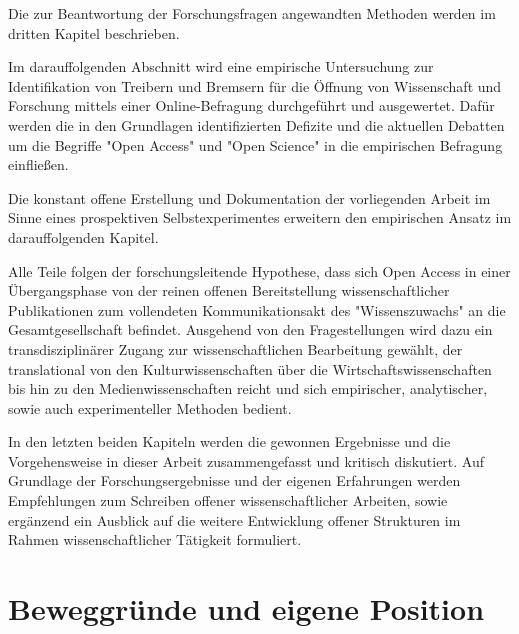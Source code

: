 Die zur Beantwortung der Forschungsfragen angewandten Methoden werden im dritten Kapitel beschrieben.

Im darauffolgenden Abschnitt wird eine empirische Untersuchung zur Identifikation von Treibern und Bremsern für die Öffnung von Wissenschaft und Forschung mittels einer Online-Befragung durchgeführt und ausgewertet. Dafür werden die in den Grundlagen identifizierten Defizite und die aktuellen Debatten um die Begriffe "Open Access" und "Open Science" in die empirischen Befragung einfließen.

Die konstant offene Erstellung und Dokumentation der vorliegenden Arbeit im Sinne eines prospektiven Selbstexperimentes erweitern den empirischen Ansatz im darauffolgenden Kapitel.

Alle Teile folgen der forschungsleitende Hypothese, dass sich Open Access in einer Übergangsphase von der reinen offenen Bereitstellung wissenschaftlicher Publikationen zum vollendeten Kommunikationsakt des "Wissenszuwachs" \cite{Luhmann1998} an die Gesamtgesellschaft befindet. Ausgehend von den Fragestellungen wird dazu ein transdisziplinärer Zugang zur wissenschaftlichen Bearbeitung gewählt, der translational von den Kulturwissenschaften über die Wirtschaftswissenschaften bis hin zu den Medienwissenschaften reicht und sich empirischer, analytischer, sowie auch experimenteller Methoden bedient.

In den letzten beiden Kapiteln werden die gewonnen Ergebnisse und die Vorgehensweise in dieser Arbeit zusammengefasst und kritisch diskutiert. Auf Grundlage der Forschungsergebnisse und der eigenen Erfahrungen werden Empfehlungen zum Schreiben offener wissenschaftlicher Arbeiten, sowie ergänzend ein Ausblick auf die weitere Entwicklung offener Strukturen im Rahmen wissenschaftlicher Tätigkeit formuliert.

\section{Beweggründe und eigene Position}

